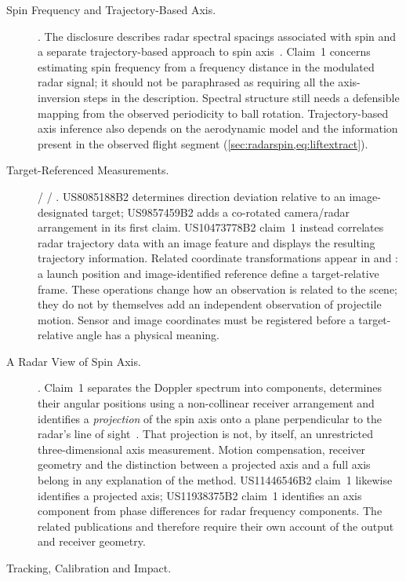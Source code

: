\begin{description}
\item[Spin Frequency and Trajectory-Based Axis.]
.
The disclosure describes radar spectral spacings associated with spin
and a separate trajectory-based approach to spin axis~\cite{us8845442}.
Claim~1 concerns estimating spin frequency from a frequency distance
in the modulated radar signal; it should not be paraphrased as requiring
all the axis-inversion steps in the description. Spectral structure
still needs a defensible mapping from the observed periodicity to ball
rotation. Trajectory-based axis inference also depends on the aerodynamic
model and the information present in the observed flight segment
(\cref{sec:radarspin,eq:liftextract}).
\item[Target-Referenced Measurements.]
 /  /
.
US8085188B2 determines direction deviation relative to an image-designated target; US9857459B2 adds a co-rotated camera/radar arrangement in its first claim.
US10473778B2 claim~1 instead correlates radar trajectory data with an image feature and displays the resulting trajectory information.
Related coordinate transformations appear in  and : a launch position and image-identified reference define a target-relative frame.
These operations change how an observation is related to the scene; they do not by themselves add an independent observation of projectile motion.
Sensor and image coordinates must be registered before a target-relative angle has a physical meaning.
\item[A Radar View of Spin Axis.]
.
Claim~1 separates the Doppler spectrum into components, determines their
angular positions using a non-collinear receiver arrangement and identifies
a \emph{projection} of the spin axis onto a plane perpendicular to the
radar's line of sight~\cite{us10850179}. That projection is not, by itself,
an unrestricted three-dimensional axis measurement. Motion compensation,
receiver geometry and the distinction between a projected axis and a full
axis belong in any explanation of the method.
US11446546B2 claim~1 likewise identifies a projected axis; US11938375B2 claim~1 identifies an axis component from phase differences for radar frequency components.
The related publications  and  therefore require their own account of the output and receiver geometry.
\item[Tracking, Calibration and Impact.]

\end{description}
